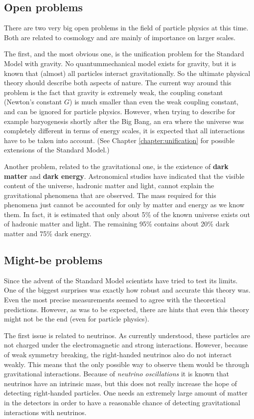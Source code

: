 \subsection{Open problems}

    There are two very big open problems in the field of particle physics at this time. Both are related to cosmology and are mainly of importance on larger scales.

    The first, and the most obvious one, is the unification problem for the Standard Model with gravity. No quantummechanical model exists for gravity, but it is known that (almost) all particles interact gravitationally. So the ultimate physical theory should describe both aspects of nature. The current way around this problem is the fact that gravity is extremely weak, the coupling constant (Newton's constant $G$) is much smaller than even the weak coupling constant, and can be ignored for particle physics. However, when trying to describe for example baryogenesis shortly after the Big Bang, an era where the universe was completely different in terms of energy scales, it is expected that all interactions have to be taken into account. (See Chapter \ref{chapter:unification} for possible extensions of the Standard Model.)

    Another problem, related to the gravitational one, is the existence of \textbf{dark matter} and \textbf{dark energy}. Astronomical studies have indicated that the visible content of the universe, hadronic matter and light, cannot explain the gravitational phenomena that are observed. The mass required for this phenomena just cannot be accounted for only by matter and energy as we know them. In fact, it is estimated that only about 5\% of the known universe exists out of hadronic matter and light. The remaining 95\% contains about 20\% dark matter and 75\% dark energy.

\subsection{Might-be problems}

    Since the advent of the Standard Model scientists have tried to test its limits. One of the biggest surprises was exactly how robust and accurate this theory was. Even the most precise measurements seemed to agree with the theoretical predictions. However, as was to be expected, there are hints that even this theory might not be the end (even for particle physics).

    The first issue is related to neutrinos. As currently understood, these particles are not charged under the electromagnetic and strong interactions. However, because of weak symmetry breaking, the right-handed neutrinos also do not interact weakly. This means that the only possible way to observe them would be through gravitational interactions. Because of \textit{neutrino oscillations} it is known that neutrinos have an intrinsic mass, but this does not really increase the hope of detecting right-handed particles. One needs an extremely large amount of matter in the detectors in order to have a reasonable chance of detecting gravitational interactions with neutrinos.

